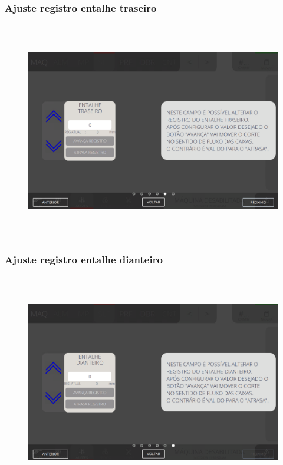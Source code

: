 \newpage
\thispagestyle{fancy}
\vspace*{40 pt}
\subsubsection{\small{Ajuste registro entalhe traseiro}}\label{telaAjustesSlotterAjusteRegistroEntalheTraseiro}
\vspace*{\fill}
\begin{figure}[h]
  \centering
  \includegraphics[width=576px,height=360px]{src/imagesFlexo/05-slotter/settings/e-5.png}
\end{figure}
\vspace*{\fill}

\newpage
\thispagestyle{fancy}
\vspace*{40 pt}
\subsubsection{\small{Ajuste registro entalhe dianteiro}}\label{telaAjustesSlotterAjusteRegistroEntalheDianteiro}
\vspace*{\fill}
\begin{figure}[h]
  \centering
  \includegraphics[width=576px,height=360px]{src/imagesFlexo/05-slotter/settings/e-6.png}
\end{figure}
\vspace*{\fill}

